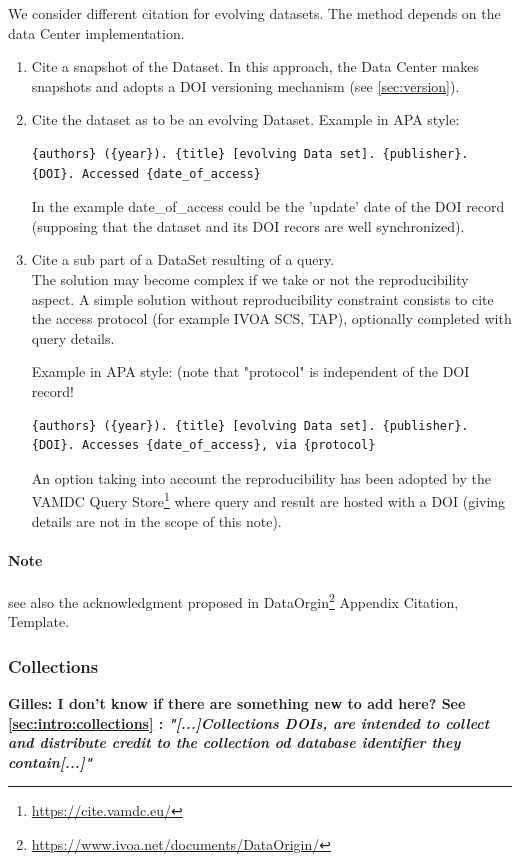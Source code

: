 \documentclass[11pt,a4paper]{ivoa}
\begin{document}
We consider different citation for evolving datasets. The method depends on the data Center implementation.

\begin{enumerate}
  \item Cite a snapshot of the Dataset. In this approach, the Data Center makes snapshots and adopts a DOI versioning mechanism (see \ref{sec:version}).
  \item  Cite the dataset as to be an evolving Dataset.
         Example in APA style:
\begin{verbatim}
{authors} ({year}). {title} [evolving Data set]. {publisher}.
{DOI}. Accessed {date_of_access}
\end{verbatim}

		In the example {date\_of\_access} could be the 'update' date of the DOI record (supposing that the dataset and its DOI recors are well synchronized).

	\item Cite a sub part of a DataSet resulting of a query.\\ 
	The solution may become complex if we take or not the reproducibility aspect.
	A simple solution without reproducibility constraint consists to cite the access protocol (for example IVOA SCS, TAP), optionally completed with query details.

	Example in APA style: (note that "protocol" is independent of the DOI record!
\begin{verbatim}
{authors} ({year}). {title} [evolving Data set]. {publisher}. 
{DOI}. Accesses {date_of_access}, via {protocol}	
\end{verbatim}

	An option taking into account the reproducibility has been adopted by the VAMDC Query Store\footnote{\url{https://cite.vamdc.eu/}} where query and result are hosted with a DOI (giving details are not in the scope of this note).
\end{enumerate}

\paragraph{Note} see also the acknowledgment proposed in DataOrgin\footnote{\url{https://www.ivoa.net/documents/DataOrigin/}} Appendix Citation, Template.

\subsubsection{Collections}
\textbf{\color{red} Gilles: I don't know if there are something new to add here?
See \ref{sec:intro:collections} : 
\textit{"[...]Collections DOIs, are intended to collect and distribute credit to the collection od database identifier they contain[...]"}
}
\end{document}
